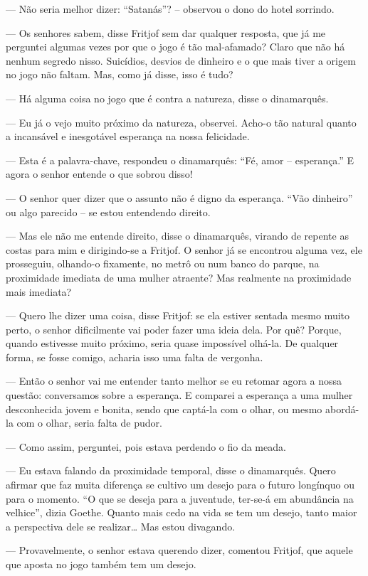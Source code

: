 --- Não seria melhor dizer: ``Satanás''? -- observou o dono do hotel
sorrindo.

--- Os senhores sabem, disse Fritjof sem dar qualquer resposta, que já me
perguntei algumas vezes por que o jogo é tão mal-afamado? Claro que não
há nenhum segredo nisso. Suicídios, desvios de dinheiro e o que mais
tiver a origem no jogo não faltam. Mas, como já disse, isso é tudo?

--- Há alguma coisa no jogo que é contra a natureza, disse o dinamarquês.

--- Eu já o vejo muito próximo da natureza, observei. Acho-o tão natural
quanto a incansável e inesgotável esperança na nossa felicidade.

--- Esta é a palavra-chave, respondeu o dinamarquês: ``Fé, amor --
esperança.'' E agora o senhor entende o que sobrou disso!

--- O senhor quer dizer que o assunto não é digno da esperança. ``Vão
dinheiro'' ou algo parecido -- se estou entendendo direito.

--- Mas ele não me entende direito, disse o dinamarquês, virando de
repente as costas para mim e dirigindo-se a Fritjof. O senhor já se
encontrou alguma vez, ele prosseguiu, olhando-o fixamente, no metrô ou
num banco do parque, na proximidade imediata de uma mulher atraente? Mas
realmente na proximidade mais imediata?

--- Quero lhe dizer uma coisa, disse Fritjof: se ela estiver sentada
mesmo muito perto, o senhor dificilmente vai poder fazer uma ideia dela.
Por quê? Porque, quando estivesse muito próximo, seria quase impossível
olhá-la. De qualquer forma, se fosse comigo, acharia isso uma falta de
vergonha.

--- Então o senhor vai me entender tanto melhor se eu retomar agora a
nossa questão: conversamos sobre a esperança. E comparei a esperança a
uma mulher desconhecida jovem e bonita, sendo que captá-la com o olhar,
ou mesmo abordá-la com o olhar, seria falta de pudor.

--- Como assim, perguntei, pois estava perdendo o fio da meada.

--- Eu estava falando da proximidade temporal, disse o dinamarquês. Quero
afirmar que faz muita diferença se cultivo um desejo para o futuro
longínquo ou para o momento. ``O que se deseja para a juventude,
ter-se-á em abundância na velhice'', dizia Goethe. Quanto mais cedo na
vida se tem um desejo, tanto maior a perspectiva dele se realizar\ldots{} Mas
estou divagando.

--- Provavelmente, o senhor estava querendo dizer, comentou Fritjof, que
aquele que aposta no jogo também tem um desejo.


